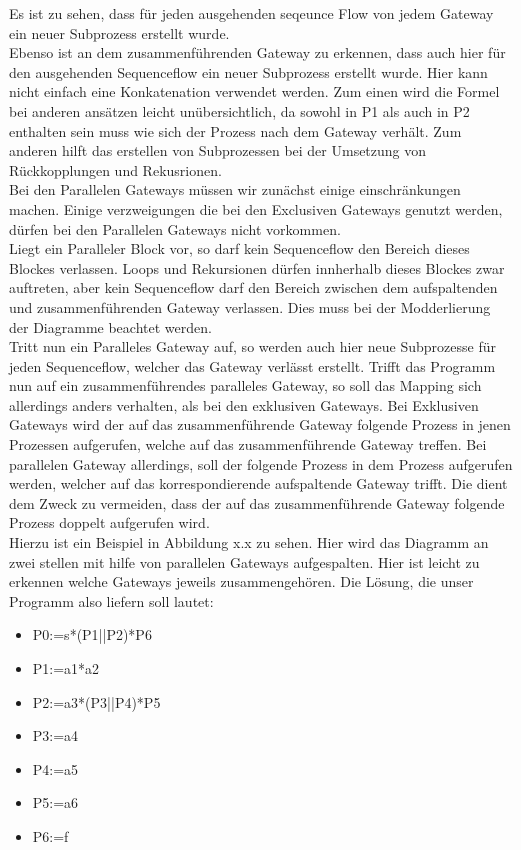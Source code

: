 Es ist zu sehen, dass für jeden ausgehenden seqeunce Flow von jedem Gateway ein neuer Subprozess erstellt wurde.\\ 
Ebenso ist an dem zusammenführenden Gateway zu erkennen, dass auch hier für den ausgehenden Sequenceflow ein neuer Subprozess erstellt wurde. Hier kann nicht einfach eine Konkatenation verwendet werden. Zum einen wird die Formel bei anderen ansätzen leicht unübersichtlich, da sowohl in P1 als auch in P2 enthalten sein muss wie sich der Prozess nach dem Gateway verhält. Zum anderen hilft das erstellen von Subprozessen bei der Umsetzung von Rückkopplungen und Rekusrionen.\\
Bei den Parallelen Gateways müssen wir zunächst einige einschränkungen machen. Einige verzweigungen die bei den Exclusiven Gateways genutzt werden, dürfen bei den Parallelen Gateways nicht vorkommen.\\
Liegt ein Paralleler Block vor, so darf kein Sequenceflow den Bereich dieses Blockes verlassen. Loops und Rekursionen dürfen innherhalb dieses Blockes zwar auftreten, aber kein Sequenceflow darf den Bereich zwischen dem aufspaltenden und zusammenführenden Gateway verlassen. Dies muss bei der Modderlierung der Diagramme beachtet werden.\\
Tritt nun ein Paralleles Gateway auf, so werden auch hier neue Subprozesse für jeden Sequenceflow, welcher das Gateway verlässt erstellt. Trifft das Programm nun auf ein zusammenführendes paralleles Gateway, so soll das Mapping sich allerdings anders verhalten, als bei den exklusiven Gateways. Bei Exklusiven Gateways wird der auf das zusammenführende Gateway folgende Prozess in jenen Prozessen aufgerufen, welche auf das zusammenführende Gateway treffen. Bei parallelen Gateway allerdings, soll der folgende Prozess in dem Prozess aufgerufen werden, welcher auf das korrespondierende aufspaltende Gateway trifft. Die dient dem Zweck zu vermeiden, dass der auf das zusammenführende Gateway folgende Prozess doppelt aufgerufen wird.\\
Hierzu ist ein Beispiel in Abbildung x.x zu sehen. Hier wird das Diagramm an zwei stellen mit hilfe von parallelen Gateways aufgespalten. Hier ist leicht zu erkennen welche Gateways jeweils zusammengehören. Die Lösung, die unser Programm also liefern soll lautet:\\
\begin{itemize}
\item P0:=s*(P1||P2)*P6
\item P1:=a1*a2
\item P2:=a3*(P3||P4)*P5
\item P3:=a4
\item P4:=a5
\item P5:=a6
\item P6:=f
\end{itemize}




